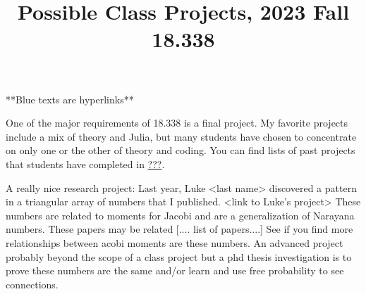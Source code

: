 \documentclass{article}
\title{Possible Class Projects, 2023 Fall 18.338}
\begin{document}
\maketitle




{\color{blue} **Blue texts are hyperlinks**}


One of the major requirements of 18.338 is a final project.  My favorite projects include a mix of theory and Julia, but many students have chosen to concentrate
on only one or the other of theory and coding.  You can find lists of past projects that students have completed in \href{ ??? } {???}.  


A really nice research project: 
Last year, Luke <last name> discovered a pattern in a triangular array of numbers that I published.  <link to Luke's project>
These numbers are related to moments for Jacobi and are a generalization of Narayana numbers.
These papers may be related [.... list of papers....]
See if you find more relationships between 
acobi moments are  these numbers.   An advanced project probably beyond the scope of a class project but a phd thesis investigation 
is to prove these numbers are the same and/or learn and  use free probability to see connections.
\end{document}
